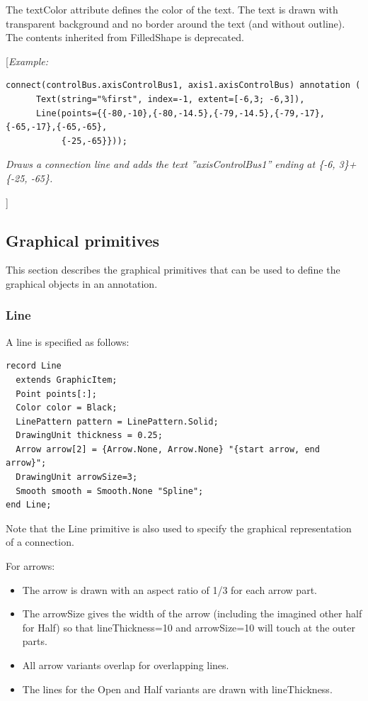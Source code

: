 \documentclass[10pt,a4paper]{report}
\def\doublelabel#1{\label{#1}}
\begin{document}
The textColor attribute defines the color of the text. The text is drawn
with transparent background and no border around the text (and without
outline). The contents inherited from FilledShape is deprecated.

{[}\emph{Example:}
\begin{lstlisting}[language=modelica]
  connect(controlBus.axisControlBus1, axis1.axisControlBus) annotation (
      Text(string="%first", index=-1, extent=[-6,3; -6,3]),
      Line(points={{-80,-10},{-80,-14.5},{-79,-14.5},{-79,-17},{-65,-17},{-65,-65},
           {-25,-65}})); 
\end{lstlisting}
\emph{Draws a connection line and adds the text ''axisControlBus1''
ending at \{-6, 3\}+\{-25, -65\}.}

{]}

\subsection{Graphical primitives}\doublelabel{graphical-primitives}

This section describes the graphical primitives that can be used to
define the graphical objects in an annotation.

\subsubsection{Line}\doublelabel{line}

A line is specified as follows:

\begin{lstlisting}[language=modelica]
record Line
  extends GraphicItem;
  Point points[:];
  Color color = Black;
  LinePattern pattern = LinePattern.Solid;
  DrawingUnit thickness = 0.25;
  Arrow arrow[2] = {Arrow.None, Arrow.None} "{start arrow, end arrow}";
  DrawingUnit arrowSize=3;
  Smooth smooth = Smooth.None "Spline";
end Line;
\end{lstlisting}
Note that the Line primitive is also used to specify the graphical
representation of a connection.

For arrows:

\begin{itemize}
\item
  The arrow is drawn with an aspect ratio of 1/3 for each arrow part.
\item
  The arrowSize gives the width of the arrow (including the imagined
  other half for Half) so that lineThickness=10 and arrowSize=10 will
  touch at the outer parts.
\item
  All arrow variants overlap for overlapping lines.
\item
  The lines for the Open and Half variants are drawn with lineThickness.
\end{itemize}
\end{document}

